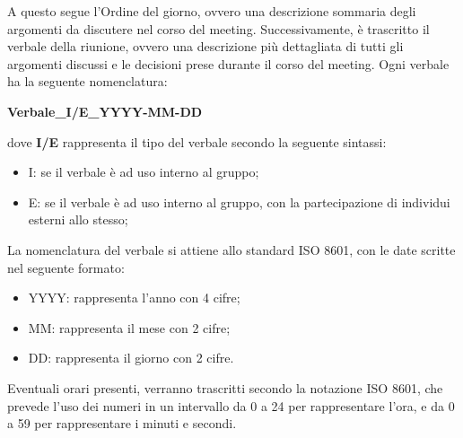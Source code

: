 A questo segue l’Ordine del giorno, ovvero una descrizione sommaria degli argomenti da discutere nel corso del meeting. Successivamente, è trascritto il verbale della riunione, ovvero una descrizione più dettagliata di tutti gli argomenti discussi e le decisioni prese durante il corso del meeting. Ogni verbale ha la seguente nomenclatura:
\begin{center}
	\textbf{Verbale_I/E_YYYY-MM-DD}
\end{center}
dove \textbf{I/E} rappresenta il tipo del verbale secondo la seguente sintassi:
\begin{itemize}
	\item I: se il verbale è ad uso interno al gruppo;
	\item E: se il verbale è ad uso interno al gruppo, con la partecipazione di individui esterni allo stesso;
\end{itemize}
La nomenclatura del verbale si attiene allo standard ISO 8601, con le date scritte nel seguente formato:
\begin{itemize}
	\item YYYY: rappresenta l’anno con 4 cifre;
	\item MM: rappresenta il mese con 2 cifre;
	\item DD: rappresenta il giorno con 2 cifre.
\end{itemize}

Eventuali orari presenti, verranno trascritti secondo la notazione ISO 8601, che prevede l’uso dei numeri in un intervallo da 0 a 24 per rappresentare l’ora, e da 0 a 59 per rappresentare i minuti e secondi.
